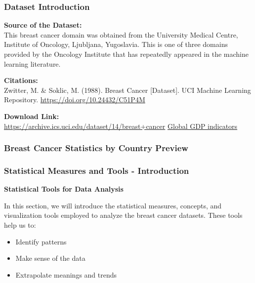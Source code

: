 \begin{frame}
    \frametitle{Dataset Introduction}
    \textbf{Source of the Dataset:}\\[1ex]
    This breast cancer domain was obtained from the University Medical Centre, Institute of Oncology, Ljubljana, Yugoslavia. This is one of three domains provided by the Oncology Institute that has repeatedly appeared in the machine learning literature.
    
    \vspace{1em}
    \textbf{Citations:}\\[0.5ex]
    Zwitter, M. \& Soklic, M. (1988). Breast Cancer [Dataset]. UCI Machine Learning Repository. \href{https://doi.org/10.24432/C51P4M}{https://doi.org/10.24432/C51P4M}
    
    \vspace{1em}
    \textbf{Download Link:}\\[0.5ex]
    \href{https://archive.ics.uci.edu/dataset/14/breast+cancer}{https://archive.ics.uci.edu/dataset/14/breast+cancer}
    \href{https://data.worldbank.org/indicator/NY.GDP.MKTP.CD}{Global GDP indicators}
\end{frame}


\begin{frame}
    \frametitle{Breast Cancer Statistics by Country Preview}
    
    \vspace{1em}
    
\end{frame}

\begin{frame}
    \frametitle{Statistical Measures and Tools - Introduction}
    \textbf{Statistical Tools for Data Analysis}

    In this section, we will introduce the statistical measures, concepts, and visualization tools employed to analyze the breast cancer datasets. These tools help us to:
    \vspace{1em}
    \begin{itemize}
        \item Identify patterns
        \item Make sense of the data
        \item Extrapolate meanings and trends
    \end{itemize}
\end{frame}

